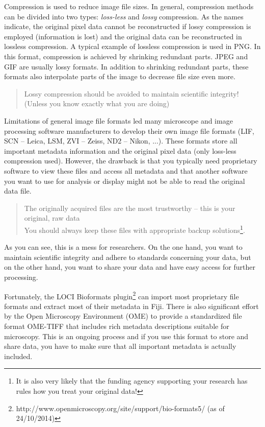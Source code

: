 Compression is used to reduce image file sizes. In general, compression methods can be divided into two types: \emph{loss-less} and \emph{lossy} compression. As the names indicate, the original pixel data cannot be reconstructed if lossy compression is employed (information is lost) and the original data can be reconstructed in lossless compression. A typical example of lossless compression is used in PNG. In this format, compression is achieved by shrinking redundant parts. JPEG and GIF are usually lossy formats. In addition to shrinking redundant parts, these formats also interpolate parts of the image to decrease file size even more.  

\begin{quotation}
	Lossy compression should be avoided to maintain scientific integrity!\\(Unless you know exactly what you are doing)
\end{quotation}

Limitations of general image file formats led many microscope and image processing software manufacturers to develop their own image file formats (LIF, SCN -- Leica, LSM, ZVI -- Zeiss, ND2 -- Nikon, ...). These formats store all important metadata information and the original pixel data (only loss-less compression used). However, the drawback is that you typically need proprietary software to view these files and access all metadata and that another software you want to use for analysis or display might not be able to read the original data file.

\begin{quotation}
	The originally acquired files are the most trustworthy -- this is your original, raw data\\You should always keep these files with appropriate backup solutions\footnote{It is also very likely that the funding agency supporting your research has rules how you treat your original data!}.
\end{quotation}

As you can see, this is a mess for researchers. On the one hand, you want to maintain scientific integrity and adhere to standards concerning your data, but on the other hand, you want to share your data and have easy access for further processing.

Fortunately, the LOCI Bioformats plugin\footnote{http://www.openmicroscopy.org/site/support/bio-formats5/ (as of 24/10/2014)} can import most proprietary file formats and extract most of their metadata in Fiji. There is also significant effort by the Open Microscopy Environment (OME) to provide a standardized file format OME-TIFF that includes rich metadata descriptions suitable for microscopy. This is an ongoing process and if you use this format to store and share data, you have to make sure that all important metadata is actually included.

